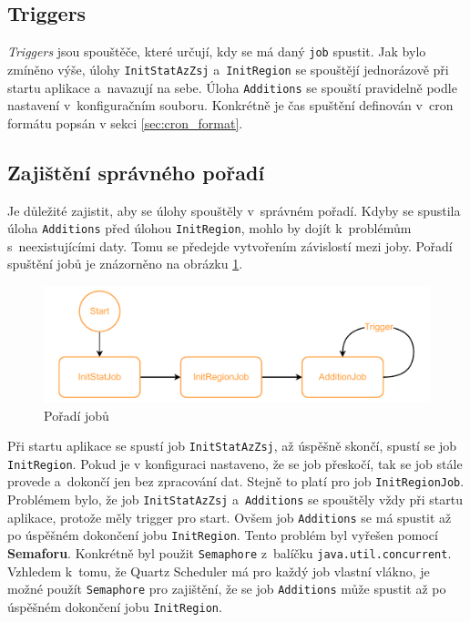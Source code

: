 \subsection{Triggers}
\textit{Triggers} jsou spouštěče, které určují, kdy se má daný \texttt{job} spustit.
Jak bylo zmíněno výše, úlohy \texttt{InitStatAzZsj} a~\texttt{InitRegion} se spouštějí jednorázově při startu aplikace a~navazují na sebe.
Úloha \texttt{Additions} se spouští pravidelně podle nastavení v~konfiguračním souboru.
Konkrétně je čas spuštění definován v~cron formátu popsán v sekci \ref{sec:cron_format}.

\subsection{Zajištění správného pořadí}
Je důležité zajistit, aby se úlohy spouštěly v~správném pořadí.
Kdyby se spustila úloha \texttt{Additions} před úlohou \texttt{InitRegion}, 
mohlo by dojít k~problémům s~neexistujícími daty.
Tomu se předejde vytvořením závislostí mezi joby.
Pořadí spuštění jobů je znázorněno na obrázku \ref{fig:jobs_scheduled}.

\begin{figure}[!h]
    \caption{Pořadí jobů}
    \label{fig:jobs_scheduled}
    \centering
    \includegraphics[width=\textwidth]{figures/jobs_scheduled.pdf}
\end{figure}

Při startu aplikace se spustí job \texttt{InitStatAzZsj}, až úspěšně skončí,
spustí se job \texttt{InitRegion}. Pokud je v konfiguraci nastaveno, že se job
přeskočí, tak se job stále provede a~dokončí jen bez zpracování dat.
Stejně to platí pro job \texttt{InitRegionJob}.
Problémem bylo, že job \texttt{InitStatAzZsj} a~\texttt{Additions}
se spouštěly vždy při startu aplikace, protože měly trigger pro start.
Ovšem job \texttt{Additions} se má spustit až po úspěšném dokončení jobu
\texttt{InitRegion}. Tento problém byl vyřešen pomocí \textbf{Semaforu}.
Konkrétně byl použit \texttt{Semaphore} z~balíčku \texttt{java.util.concurrent}.
Vzhledem k~tomu, že Quartz Scheduler má pro každý job vlastní vlákno,
je možné použít \texttt{Semaphore} pro zajištění, že se job \texttt{Additions}
může spustit až po úspěšném dokončení jobu \texttt{InitRegion}.

